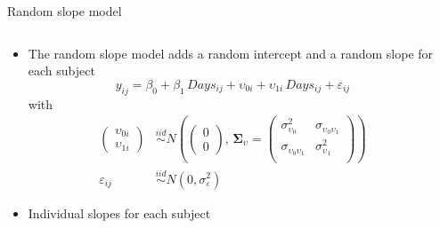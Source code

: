 \documentclass[aspectratio=169]{beamer}
\newcommand{\gmat}[1]{\boldsymbol{#1}}
\begin{document}
% 
% 

\begin{frame}[fragile]{Random slope model}
  \begin{columns}
    \begin{column}{.5\textwidth}
  \begin{itemize}
\item The random slope model adds a random intercept and a random slope for each
  subject
\[
  y_{ij} = \beta_0 + \beta_1\,Days_{ij} + \upsilon_{0i} +
      \upsilon_{1i}\,Days_{ij} + \varepsilon_{ij}
\]
with
\begin{align*}
  \begin{pmatrix} \upsilon_{0i}\\ \upsilon_{1i} \end{pmatrix} &\overset{iid}{\sim}
    N \left(\begin{pmatrix} 0\\ 0 \end{pmatrix}, \, \gmat{\Sigma}_\upsilon =
      \begin{pmatrix}
        \sigma^2_{\upsilon_0} & \sigma_{\upsilon_0 \upsilon_1} \\
        \sigma_{\upsilon_0 \upsilon_1} & \sigma^2_{\upsilon_1} \\
      \end{pmatrix} \right)
    \\
  \varepsilon_{ij} & \overset{iid}{\sim} N(0, \sigma_{\varepsilon}^2)
\end{align*}
      \vspace{-.5cm}
    \item Individual slopes for each subject
  \end{itemize}
    \end{column}
    \begin{column}{.5\textwidth}

\end{column}
\end{columns}
\end{frame}
\end{document}
